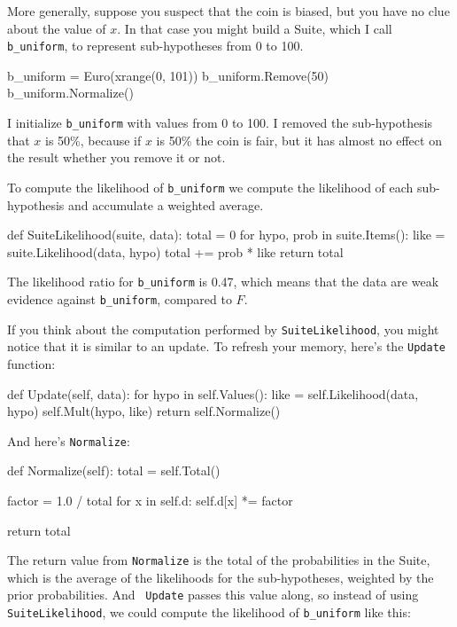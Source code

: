 \documentclass[12pt]{book}
\theoremstyle{exercise}
\begin{document}
More generally, suppose you suspect that the coin is biased, but you
have no clue about the value of $x$.  In that case you might build a
Suite, which I call \verb"b_uniform", to represent sub-hypotheses from
0 to 100.

\begin{code}
    b_uniform = Euro(xrange(0, 101))
    b_uniform.Remove(50)
    b_uniform.Normalize()
\end{code}

I initialize \verb"b_uniform" with values from 0 to 100.
I removed the sub-hypothesis that $x$ is 50\%, because if
$x$ is 50\% the coin is fair, but it has almost no
effect on the result whether you remove it or not.

To compute the likelihood of
\verb"b_uniform" we compute the likelihood of each sub-hypothesis
and accumulate a weighted average.

\begin{code}
def SuiteLikelihood(suite, data):
    total = 0
    for hypo, prob in suite.Items():
        like = suite.Likelihood(data, hypo)
        total += prob * like
    return total
\end{code}

The likelihood ratio for \verb"b_uniform" is 0.47, which means
that the data are weak evidence against \verb"b_uniform",
compared to $F$.

If you think about the computation performed by
\verb"SuiteLikelihood", you might notice that it is similar to an
update.  To refresh your memory, here's the {\tt Update} function:

\begin{code}
    def Update(self, data):
        for hypo in self.Values():
            like = self.Likelihood(data, hypo)
            self.Mult(hypo, like)
        return self.Normalize()
\end{code}

And here's {\tt Normalize}:

\begin{code}
    def Normalize(self):
        total = self.Total()
        
        factor = 1.0 / total
        for x in self.d:
            self.d[x] *= factor

        return total
\end{code}

The return value from {\tt Normalize} is the total of the
probabilities in the Suite, which is the average of the likelihoods
for the sub-hypotheses, weighted by the prior probabilities.  And {\tt
  Update} passes this value along, so instead of using {\tt
  SuiteLikelihood}, we could compute the likelihood of
\verb"b_uniform" like this:
\end{document}
